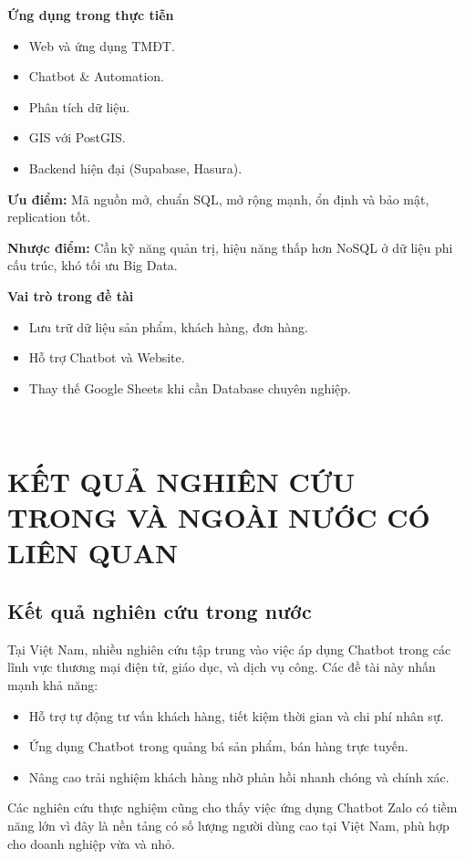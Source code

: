 \textbf{Ứng dụng trong thực tiễn}
\begin{itemize}
    \item Web và ứng dụng TMĐT.
    \item Chatbot \& Automation.
    \item Phân tích dữ liệu.
    \item GIS với PostGIS.
    \item Backend hiện đại (Supabase, Hasura).
\end{itemize}

\textbf{Ưu điểm:} Mã nguồn mở, chuẩn SQL, mở rộng mạnh, ổn định và bảo mật, replication tốt. 

\textbf{Nhược điểm:} Cần kỹ năng quản trị, hiệu năng thấp hơn NoSQL ở dữ liệu phi cấu trúc, khó tối ưu Big Data.

\textbf{Vai trò trong đề tài}
\begin{itemize}
    \item Lưu trữ dữ liệu sản phẩm, khách hàng, đơn hàng.
    \item Hỗ trợ Chatbot và Website.
    \item Thay thế Google Sheets khi cần Database chuyên nghiệp.
    
\end{itemize}

\\
\section{KẾT QUẢ NGHIÊN CỨU TRONG VÀ NGOÀI NƯỚC CÓ LIÊN QUAN}
\subsection{Kết quả nghiên cứu trong nước}
Tại Việt Nam, nhiều nghiên cứu tập trung vào việc áp dụng Chatbot trong các lĩnh vực thương mại điện tử, giáo dục, và dịch vụ công. Các đề tài này nhấn mạnh khả năng:
\begin{itemize}
    \item Hỗ trợ tự động tư vấn khách hàng, tiết kiệm thời gian và chi phí nhân sự.
    \item Ứng dụng Chatbot trong quảng bá sản phẩm, bán hàng trực tuyến.
    \item Nâng cao trải nghiệm khách hàng nhờ phản hồi nhanh chóng và chính xác.
\end{itemize}

Các nghiên cứu thực nghiệm cũng cho thấy việc ứng dụng Chatbot Zalo có tiềm năng lớn vì đây là nền tảng có số lượng người dùng cao tại Việt Nam, phù hợp cho doanh nghiệp vừa và nhỏ.

